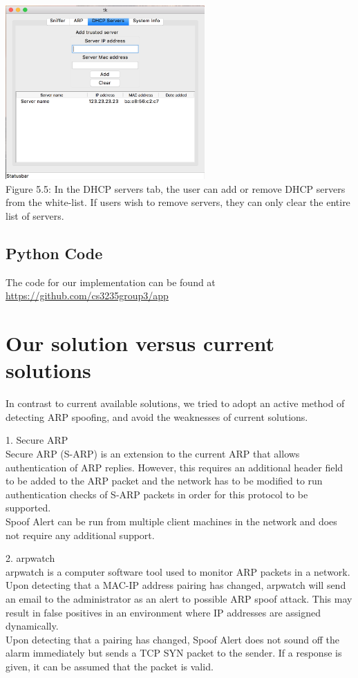 \documentclass{acm_proc_article-sp}
\begin{document}
\includegraphics[width=3in]{architecture05.png} \\
Figure 5.5: In the DHCP servers tab, the user can add or remove DHCP servers from the white-list. If users wish to remove servers, they can only clear the entire list of servers. 

\subsection{Python Code}
The code for our implementation can be found at \\
\url{https://github.com/cs3235group3/app}

\section{Our solution versus current \\solutions}
In contrast to current available solutions, we tried to adopt an active method of detecting ARP spoofing, and avoid the weaknesses of current solutions.  

1. Secure ARP\\
Secure ARP (S-ARP) is an extension to the current ARP that allows authentication of ARP replies. However, this requires an additional header field to be added to the ARP packet and the network has to be modified to run authentication checks of S-ARP packets in order for this protocol to be supported. \\
Spoof Alert can be run from multiple client machines in the network and does not require any additional support.

2. arpwatch \\
arpwatch is a computer software tool used to monitor ARP packets in a network. Upon detecting that a MAC-IP address pairing has changed, arpwatch will send an email to the administrator as an alert to possible ARP spoof attack. This may result in false positives in an environment where IP addresses are assigned dynamically. \\
Upon detecting that a pairing has changed, Spoof Alert does not sound off the alarm immediately but sends a TCP SYN packet to the sender. If a response is given, it can be assumed that the packet is valid.
\end{document}
